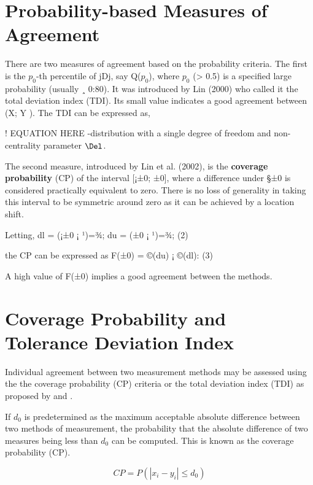 \section{Probability-based Measures of Agreement}
There are two measures of agreement based on the probability criteria. The first is the
$p_0$-th percentile of jDj, say Q($p_0$), where $p_0$ (> 0.5) is a specified large probability (usually
¸ 0:80). 
It was introduced by Lin (2000) who called it the total deviation index (TDI). Its
small value indicates a good agreement between (X; Y ). The TDI can be expressed as,

! EQUATION HERE
-distribution with a single degree of freedom
and non-centrality parameter $\Del$.


The second measure, introduced by Lin et al. (2002), is the \textbf{coverage probability} (CP) of
the interval [¡±0; ±0], where a difference under §±0 is considered practically equivalent to
zero. There is no loss of generality in taking this interval to be symmetric around zero as it
can be achieved by a location shift. 

Letting,
dl = (¡±0 ¡ ¹)=¾; du = (±0 ¡ ¹)=¾; (2)


the CP can be expressed as
F(±0) = ©(du) ¡ ©(dl): (3)

A high value of F(±0) implies a good agreement between the methods.


\section{Coverage Probability and Tolerance Deviation Index}

Individual agreement between two measurement methods may be
assessed using the the coverage probability (CP) criteria or the
total deviation index (TDI) as proposed by \citet{lin2000} and
\citet{lin2002}.

If $d_{0}$ is predetermined as the maximum acceptable absolute
difference between two methods of measurement, the probability
that the absolute difference of two measures being less than
$d_{0}$ can be computed. This is known as the coverage probability
(CP).

\begin{equation}
CP = P(|x_{i} - y_{i}| \leq d_{0})
\end{equation}

